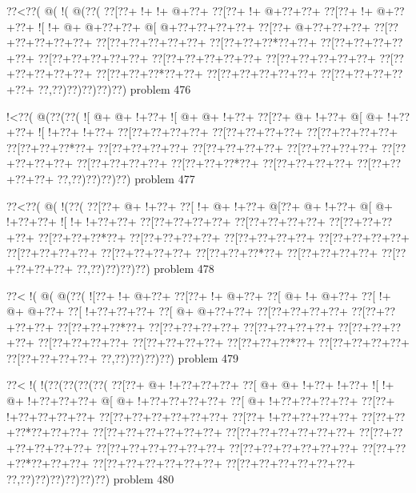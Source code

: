 \vbox{\vbox{\goo
\0??<\0??(\- @(\- !(\- @(\0??(
\0??[\0??+\- !+\- !+\- @+\0??+
\0??[\0??+\- !+\- @+\0??+\0??+
\0??[\0??+\- !+\- @+\0??+\0??+
\- ![\- !+\- @+\- @+\0??+\0??+
\- @[\- @+\0??+\0??+\0??+\0??+
\0??[\0??+\- @+\0??+\0??+\0??+
\0??[\0??+\0??+\0??+\0??+\0??+
\0??[\0??+\0??+\0??+\0??+\0??+
\0??[\0??+\0??+\0??*\0??+\0??+
\0??[\0??+\0??+\0??+\0??+\0??+
\0??[\0??+\0??+\0??+\0??+\0??+
\0??[\0??+\0??+\0??+\0??+\0??+
\0??[\0??+\0??+\0??+\0??+\0??+
\0??[\0??+\0??+\0??+\0??+\0??+
\0??[\0??+\0??+\0??*\0??+\0??+
\0??[\0??+\0??+\0??+\0??+\0??+
\0??[\0??+\0??+\0??+\0??+\0??+
\0??,\0??)\0??)\0??)\0??)\0??)
}
\hfil problem 476\hfil\break
}

\vbox{\vbox{\goo
\- !<\0??(\- @(\0??(\0??(
\- ![\- @+\- @+\- !+\0??+
\- ![\- @+\- @+\- !+\0??+
\0??[\0??+\- @+\- !+\0??+
\- @[\- @+\- !+\0??+\0??+
\- ![\- !+\0??+\- !+\0??+
\0??[\0??+\0??+\0??+\0??+
\0??[\0??+\0??+\0??+\0??+
\0??[\0??+\0??+\0??+\0??+
\0??[\0??+\0??+\0??*\0??+
\0??[\0??+\0??+\0??+\0??+
\0??[\0??+\0??+\0??+\0??+
\0??[\0??+\0??+\0??+\0??+
\0??[\0??+\0??+\0??+\0??+
\0??[\0??+\0??+\0??+\0??+
\0??[\0??+\0??+\0??*\0??+
\0??[\0??+\0??+\0??+\0??+
\0??[\0??+\0??+\0??+\0??+
\0??,\0??)\0??)\0??)\0??)
}
\hfil problem 477\hfil\break
}

\vbox{\vbox{\goo
\0??<\0??(\- @(\- !(\0??(
\0??[\0??+\- @+\- !+\0??+
\0??[\- !+\- @+\- !+\0??+
\- @[\0??+\- @+\- !+\0??+
\- @[\- @+\- !+\0??+\0??+
\- ![\- !+\- !+\0??+\0??+
\0??[\0??+\0??+\0??+\0??+
\0??[\0??+\0??+\0??+\0??+
\0??[\0??+\0??+\0??+\0??+
\0??[\0??+\0??+\0??*\0??+
\0??[\0??+\0??+\0??+\0??+
\0??[\0??+\0??+\0??+\0??+
\0??[\0??+\0??+\0??+\0??+
\0??[\0??+\0??+\0??+\0??+
\0??[\0??+\0??+\0??+\0??+
\0??[\0??+\0??+\0??*\0??+
\0??[\0??+\0??+\0??+\0??+
\0??[\0??+\0??+\0??+\0??+
\0??,\0??)\0??)\0??)\0??)
}
\hfil problem 478\hfil\break
}

\vbox{\vbox{\goo
\0??<\- !(\- @(\- @(\0??(
\- ![\0??+\- !+\- @+\0??+
\0??[\0??+\- !+\- @+\0??+
\0??[\- @+\- !+\- @+\0??+
\0??[\- !+\- @+\- @+\0??+
\0??[\- !+\0??+\0??+\0??+
\0??[\- @+\- @+\0??+\0??+
\0??[\0??+\0??+\0??+\0??+
\0??[\0??+\0??+\0??+\0??+
\0??[\0??+\0??+\0??*\0??+
\0??[\0??+\0??+\0??+\0??+
\0??[\0??+\0??+\0??+\0??+
\0??[\0??+\0??+\0??+\0??+
\0??[\0??+\0??+\0??+\0??+
\0??[\0??+\0??+\0??+\0??+
\0??[\0??+\0??+\0??*\0??+
\0??[\0??+\0??+\0??+\0??+
\0??[\0??+\0??+\0??+\0??+
\0??,\0??)\0??)\0??)\0??)
}
\hfil problem 479\hfil\break
}

\vbox{\vbox{\goo
\0??<\- !(\- !(\0??(\0??(\0??(\0??(
\0??[\0??+\- @+\- !+\0??+\0??+\0??+
\0??[\- @+\- @+\- !+\0??+\- !+\0??+
\- ![\- !+\- @+\- !+\0??+\0??+\0??+
\- @[\- @+\- !+\0??+\0??+\0??+\0??+
\0??[\- @+\- !+\0??+\0??+\0??+\0??+
\0??[\0??+\- !+\0??+\0??+\0??+\0??+
\0??[\0??+\0??+\0??+\0??+\0??+\0??+
\0??[\0??+\- !+\0??+\0??+\0??+\0??+
\0??[\0??+\0??+\0??*\0??+\0??+\0??+
\0??[\0??+\0??+\0??+\0??+\0??+\0??+
\0??[\0??+\0??+\0??+\0??+\0??+\0??+
\0??[\0??+\0??+\0??+\0??+\0??+\0??+
\0??[\0??+\0??+\0??+\0??+\0??+\0??+
\0??[\0??+\0??+\0??+\0??+\0??+\0??+
\0??[\0??+\0??+\0??*\0??+\0??+\0??+
\0??[\0??+\0??+\0??+\0??+\0??+\0??+
\0??[\0??+\0??+\0??+\0??+\0??+\0??+
\0??,\0??)\0??)\0??)\0??)\0??)\0??)
}
\hfil problem 480\hfil\break
}

